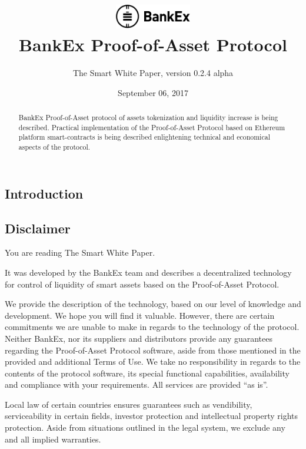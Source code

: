 \documentclass{article}
\title{\vspace{-3.85em}\includegraphics[width=0.25\textwidth]{logo.pdf} \\ \vspace{24pt} BankEx Proof-of-Asset Protocol}
\author{The Smart White Paper, version 0.2.4 alpha}
\date{September 06, 2017}
\begin{document}
\maketitle

\begin{abstract}
BankEx Proof-of-Asset protocol of assets tokenization and liquidity increase is being described. Practical implementation of the Proof-of-Asset Protocol based on Ethereum platform smart-contracts is being described enlightening technical and economical aspects of the protocol.
\end{abstract}

\vspace{24pt}

\begin{multicols}{2}

\tableofcontents

\section{Introduction}

\subsection{Disclaimer}

You are reading The Smart White Paper.

It was developed by the BankEx team and describes a decentralized technology for control of liquidity of smart assets based on the Proof-of-Asset Protocol.
	
We provide the description of the technology, based on our level of knowledge and development. We hope you will find it valuable. However, there are certain commitments we are unable to make in regards to the technology of the protocol.  
Neither BankEx, nor its suppliers and distributors provide any guarantees regarding the Proof-of-Asset Protocol software, aside from those mentioned in the provided and additional Terms of Use. We take no responsibility in regards to the contents of the protocol software, its special functional capabilities, availability and compliance with your requirements. All services are provided \enquote{as is}.

Local law of certain countries ensures guarantees such as vendibility, serviceability in certain fields, investor protection and intellectual property rights protection. Aside from situations outlined in the legal system, we exclude any and all implied warranties.


\end{multicols}
\end{document}
